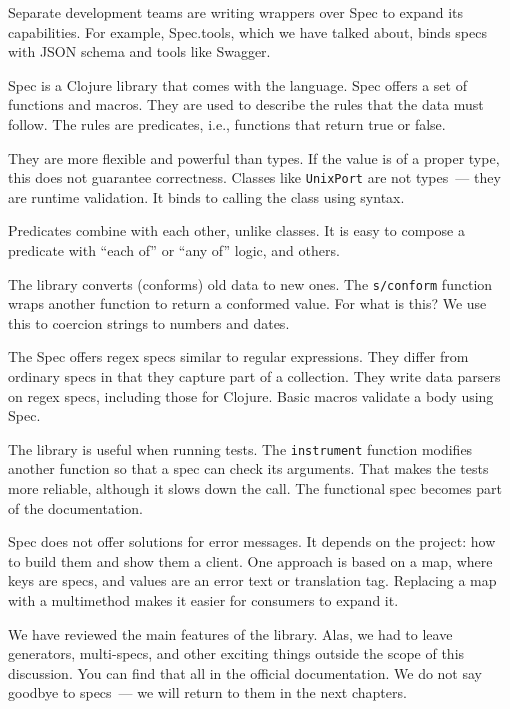 Separate development teams are writing wrappers over Spec to expand its capabilities. For example, Spec.tools, which we have talked about, binds specs with JSON schema and tools like Swagger.

\indexff
Spec is a Clojure library that comes with the language. Spec offers a set of functions and macros. They are used to describe the rules that the data must follow. The rules are predicates, i.e., functions that return true or false.

They are more flexible and powerful than types. If the value is of a proper type, this does not guarantee correctness. Classes like \verb|UnixPort| are not types~--- they are runtime validation. It binds to calling the class using syntax.

Predicates combine with each other, unlike classes. It is easy to compose a predicate with “each of” or “any of” logic, and others. 

The library converts (conforms) old data to new ones. The \verb|s/conform| function wraps another function to return a conformed value. For what is this? We use this to coercion strings to numbers and dates.

The Spec offers regex specs similar to regular expressions. They differ from ordinary specs in that they capture part of a collection. They write data parsers on regex specs, including those for Clojure. Basic macros validate a body using Spec.

The library is useful when running tests. The \verb|instrument| function modifies another function so that a spec can check its arguments. That makes the tests more reliable, although it slows down the call. The functional spec becomes part of the documentation.

Spec does not offer solutions for error messages. It depends on the project: how to build them and show them a client. One approach is based on a map, where keys are specs, and values are an error text or translation tag. Replacing a map with a multimethod makes it easier for consumers to expand it.

We have reviewed the main features of the library. Alas, we had to leave generators, multi-specs, and other exciting things outside the scope of this discussion. You can find that all in the official documentation. We do not say goodbye to specs~--- we will return to them in the next chapters.
